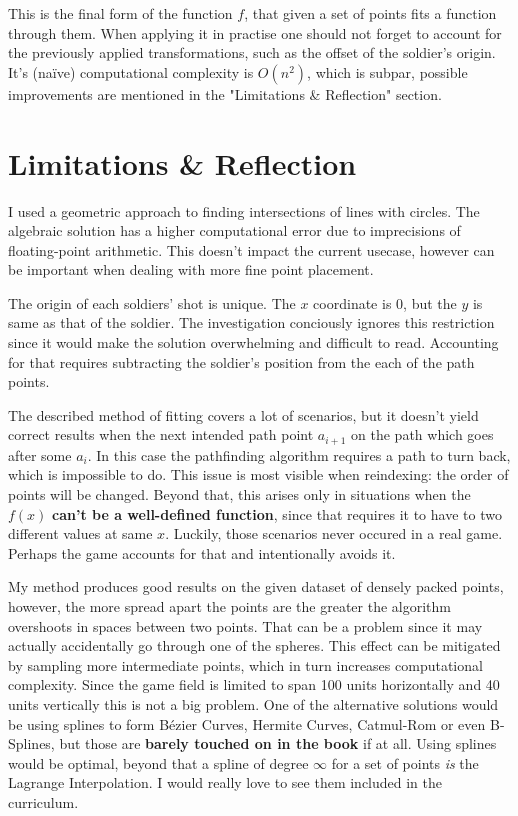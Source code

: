 \documentclass[12pt, titlepage]{article}
\begin{document}
This is the final form of the function $f$, that given a set of points 
fits a function through them. When applying it in practise one should 
not forget to account for the previously applied transformations, such as 
the offset of the soldier's origin. It's (na\"ive) computational complexity
is $O(n^2)$, which is subpar, possible improvements are mentioned in the 
"Limitations \& Reflection" section.

\section{Limitations \& Reflection}
I used a geometric approach to finding intersections of lines with circles.
The algebraic solution has a higher computational error due to imprecisions 
of floating-point arithmetic. This doesn't impact the current usecase,
however can be important when dealing with more fine point placement.

The origin of each soldiers' shot is unique. The $x$ 
coordinate is $0$, but the $y$ is same as that of the soldier. The investigation
conciously ignores this restriction since it would make the solution overwhelming
and difficult to read. Accounting for that requires subtracting the soldier's 
position from the each of the path points.

The described method of fitting covers a lot of scenarios, but it doesn't yield 
correct results
when the next intended path point $a_{i + 1}$ on the path which goes after 
some $a_i$. In this case the pathfinding algorithm requires a path to turn back,
which is impossible to do. This issue is most visible when reindexing: the order
of points will be changed. Beyond that, this arises only in situations when the 
$f(x)$ \textbf{can't be a well-defined function}, since that requires it to have to
two different values at same $x$. Luckily, those scenarios never occured in a 
real game. Perhaps the game accounts for that and intentionally avoids it.

My method produces good results on the given dataset of densely packed points,
however, the more spread apart the points are the greater the algorithm
overshoots in spaces between two points. That can be a problem since it may 
actually accidentally go through one of the spheres. This effect can be
mitigated by sampling more intermediate points, which in turn increases 
computational complexity. Since the game field is  limited to span 100 units
horizontally and 40 units vertically this is not a big problem. One of the
alternative solutions would be using splines to form B\'{e}zier Curves, 
Hermite Curves, Catmul-Rom or even B-Splines, but those are \textbf{barely touched 
on in the book} if at all. Using splines would be optimal, beyond that
a spline of degree $\infty$ for a set of points \textit{is} the Lagrange
Interpolation. I would really love to see them included in the 
curriculum.
\end{document}
